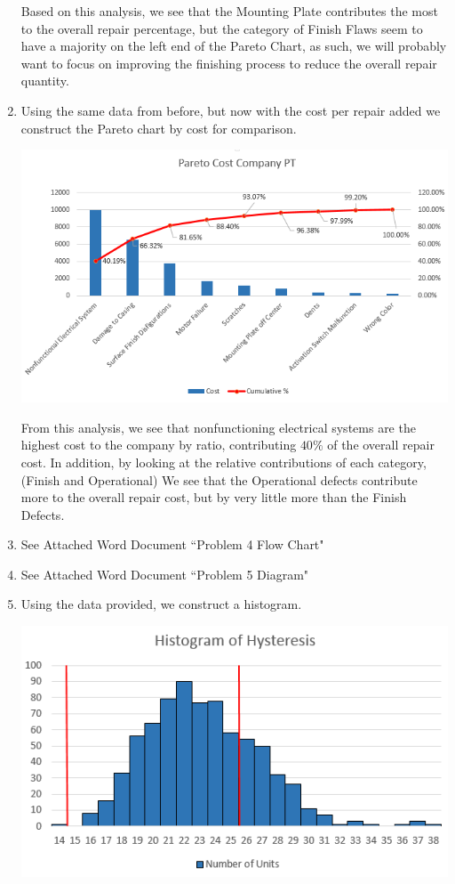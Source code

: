 \documentclass[letterpaper,10pt]{article}
\begin{document}
\begin{enumerate}
\begin{center}
\end{center}
Based on this analysis, we see that the Mounting Plate contributes the most to the overall repair percentage, but the category of Finish Flaws seem to have a majority on the left end of the Pareto Chart, as such, we will probably want to focus on improving the finishing process to reduce the overall repair quantity.
\item Using the same data from before, but now with the cost per repair added we construct the Pareto chart by cost for comparison.
\begin{center}
\includegraphics[scale=1]{3costpareto.png}
\end{center}
From this analysis, we see that nonfunctioning electrical systems are the highest cost to the company by ratio, contributing $40\%$ of the overall repair cost. In addition, by looking at the relative contributions of each category, (Finish and Operational) We see that the Operational defects contribute more to the overall repair cost, but by very little more than the Finish Defects.
\item See Attached Word Document ``Problem 4 Flow Chart"
\item See Attached Word Document ``Problem 5 Diagram"
\item Using the data provided, we construct a histogram.
\begin{center}
\includegraphics[scale=1]{6hist.png}

\end{center}
\end{enumerate}
\end{document}
